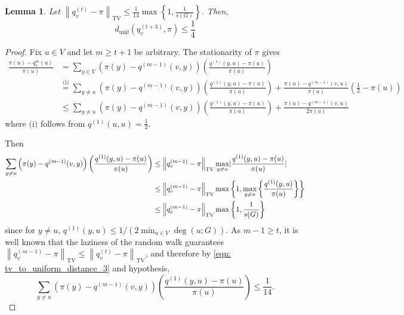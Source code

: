 \documentclass[11pt,twoside]{article}
\newtheorem{lemma}{Lemma}
\DeclarePairedDelimiter\abs{\lvert}{\rvert}
\newcommand{\set}[1]{\left\{#1\right\}}
\newcommand{\norm}[1]{\left\lVert#1\right\rVert}
\newcommand{\1}{\mathbf{1}}
\begin{document}
\begin{lemma}
	\label{lem: tv_to_uniform_distance}
	Let $\norm{q_v^{(t)} - \pi}_{\mathrm{TV}} \leq \frac{1}{14} \max \set{1, \frac{1}{s(G)}}$. Then,
	\begin{equation*}
	d_{\mathrm{unif}}(q_v^{(t + 3)},\pi) \leq \frac{1}{4}
	\end{equation*}
\end{lemma}
\begin{proof}
	Fix $u \in V$ and let $m \geq t + 1$ be arbitrary. The stationarity of $\pi$ gives
	\begin{align}
	\frac{\pi(u) - q_v^{m}(u)}{\pi(u)} & = \sum_{y \in V} \left(\pi(y) - q^{(m-1)}(v,y)\right) \left(\frac{q^{(1)}(y,u) - \pi(u)}{\pi(u)}\right) \nonumber \\
	& \overset{\text{(i)}}{=} \sum_{y \neq u} \left(\pi(y) - q^{(m-1)}(v,y)\right) \left(\frac{q^{(1)}(y,u) - \pi(u)}{\pi(u)}\right) + \frac{\pi(u) - q^{(m - 1)}(v,u)}{\pi(u)} \left(\frac{1}{2} - \pi(u)\right) \nonumber \\
	& \leq \sum_{y \neq u} \left(\pi(y) - q^{(m-1)}(v,y)\right) \left(\frac{q^{(1)}(y,u) - \pi(u)}{\pi(u)}\right) + \frac{\pi(u) - q^{(m - 1)}(v,u)}{2 \pi(u)} \label{eqn: tv_to_uniform_distance_1}
	\end{align}
	where $\text{(i)}$ follows from $q^{(1)}(u,u) = \frac{1}{2}$. 
	
	Then 
	\begin{align}
	\sum_{y \neq u} \left(\pi(y) - q^{(m-1)}(v,y)\right) \left(\frac{q^{(1)}(y,u) - \pi(u)}{\pi(u)}\right) & \leq \norm{q_v^{(m-1)} - \pi}_{\mathrm{TV}} \max_{y \neq u} \abs{\frac{q^{(1)}(y,u) - \pi(u)}{\pi(u)}} \nonumber \\
	& \leq \norm{q_v^{(m-1)} - \pi}_{\mathrm{TV}} \max \set{1, \max_{y \neq u}\set{\frac{q^{(1)}(y,u)}{\pi(u)}}} \nonumber \\
	& \leq \norm{q_v^{(m-1)} - \pi}_{\mathrm{TV}} \max \set{1, \frac{1}{s(G)}} \label{eqn: tv_to_uniform_distance_3}
	\end{align}
	since for $y \neq u$, $q^{(1)}(y,u) \leq 1/\left(2 \min_{u \in V} \deg(u; G)\right)$. As $m - 1 \geq t$, it is well known \cite{lovasz1990} that the laziness of the random walk guarantees $\norm{q_v^{(m - 1)} - \pi}_{\mathrm{TV}} \leq \norm{q_v^{(t)} - \pi}_{\mathrm{TV}}$, and therefore by \eqref{eqn: tv_to_uniform_distance_3} and hypothesis,
	\begin{equation*}
	\sum_{y \neq u} \left(\pi(y) - q^{(m-1)}(v,y)\right) \left(\frac{q^{(1)}(y,u) - \pi(u)}{\pi(u)}\right) \leq \frac{1}{14}.
	\end{equation*}
	

\end{proof}
\end{document}
